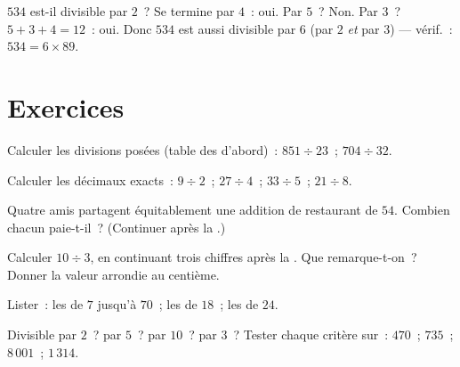 \begin{example}\label{ex:g5:division:criteria}
$534$ est-il divisible par $2$~? Se termine par $4$~: oui. Par
$5$~? Non. Par $3$~? $5 + 3 + 4 = 12$~: oui. Donc $534$ est aussi
divisible par $6$ (par $2$ \emph{et} par $3$) --- vérif.~:
$534 = 6 \times 89$.
\end{example}

\section{Exercices}

\begin{exercise}[$\star$]\label{exo:g5:division:1}
Calculer les divisions posées (table des  d'abord)~:
$851 \div 23$~; \quad $704 \div 32$.
\end{exercise}

\begin{exercise}[$\star$]\label{exo:g5:division:2}
Calculer les  décimaux exacts~: $9 \div 2$~; \quad
$27 \div 4$~; \quad $33 \div 5$~; \quad $21 \div 8$.
\end{exercise}

\begin{exercise}[$\star$]\label{exo:g5:division:3}
Quatre amis partagent équitablement une addition de restaurant de
$54$. Combien chacun paie-t-il~? (Continuer après la .)
\end{exercise}

\begin{exercise}[$\star$]\label{exo:g5:division:4}
Calculer $10 \div 3$, en continuant trois chiffres après la
. Que remarque-t-on~? Donner la valeur arrondie au
centième.
\end{exercise}

\begin{exercise}[$\star$]\label{exo:g5:division:5}
Lister~: les  de $7$ jusqu'à $70$~; les  de
$18$~; les  de $24$.
\end{exercise}

\begin{exercise}[$\star$]\label{exo:g5:division:6}
Divisible par $2$~? par $5$~? par $10$~? par $3$~? Tester chaque
critère sur~: $470$~; \quad $735$~; \quad $8\,001$~; \quad
$1\,314$.
\end{exercise}

